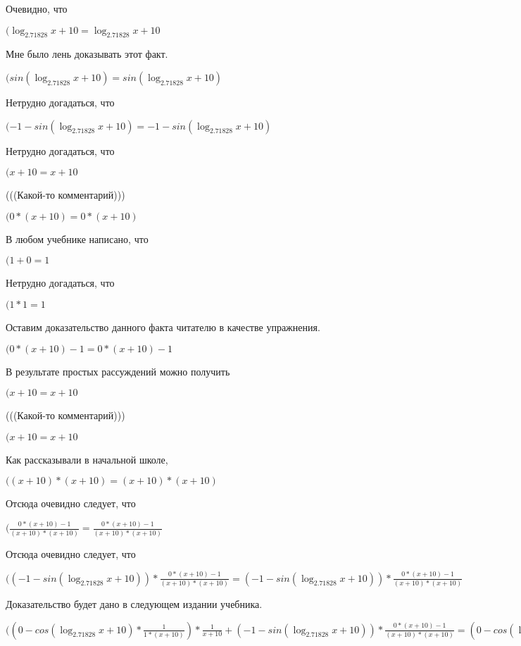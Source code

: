 \documentclass[12pt,a4paper,fleqn]{article}
\theoremstyle{definition}
\begin{document}
Очевидно, что

$(\log_{ 2.71828 }{ x  +  10 } = \log_{ 2.71828 }{ x  +  10 }$

Мне было лень доказывать этот факт.

$(sin(\log_{ 2.71828 }{ x  +  10 }) = sin(\log_{ 2.71828 }{ x  +  10 })$

Нетрудно догадаться, что

$( -1  - sin(\log_{ 2.71828 }{ x  +  10 }) =  -1  - sin(\log_{ 2.71828 }{ x  +  10 })$

Нетрудно догадаться, что

$( x  +  10  =  x  +  10 $

(((Какой-то комментарий)))

$( 0  * ( x  +  10 ) =  0  * ( x  +  10 )$

В любом учебнике написано, что

$( 1  +  0  =  1 $

Нетрудно догадаться, что

$( 1  *  1  =  1 $

Оставим доказательство данного факта читателю в качестве упражнения.

$( 0  * ( x  +  10 ) -  1  =  0  * ( x  +  10 ) -  1 $

В результате простых рассуждений можно получить

$( x  +  10  =  x  +  10 $

(((Какой-то комментарий)))

$( x  +  10  =  x  +  10 $

Как рассказывали в начальной школе,

$(( x  +  10 ) * ( x  +  10 ) = ( x  +  10 ) * ( x  +  10 )$

Отсюда очевидно следует, что

$(\frac{ 0  * ( x  +  10 ) -  1 }{( x  +  10 ) * ( x  +  10 )}
 = \frac{ 0  * ( x  +  10 ) -  1 }{( x  +  10 ) * ( x  +  10 )}
$

Отсюда очевидно следует, что

$(( -1  - sin(\log_{ 2.71828 }{ x  +  10 })) * \frac{ 0  * ( x  +  10 ) -  1 }{( x  +  10 ) * ( x  +  10 )}
 = ( -1  - sin(\log_{ 2.71828 }{ x  +  10 })) * \frac{ 0  * ( x  +  10 ) -  1 }{( x  +  10 ) * ( x  +  10 )}
$

Доказательство будет дано в следующем издании учебника.

$(( 0  - cos(\log_{ 2.71828 }{ x  +  10 }) * \frac{ 1 }{ 1  * ( x  +  10 )}
) * \frac{ 1 }{ x  +  10 }
 + ( -1  - sin(\log_{ 2.71828 }{ x  +  10 })) * \frac{ 0  * ( x  +  10 ) -  1 }{( x  +  10 ) * ( x  +  10 )}
 = ( 0  - cos(\log_{ 2.71828 }{ x  +  10 }) * \frac{ 1 }{ 1  * ( x  +  10 )}
) * \frac{ 1 }{ x  +  10 }
 + ( -1  - sin(\log_{ 2.71828 }{ x  +  10 })) * \frac{ 0  * ( x  +  10 ) -  1 }{( x  +  10 ) * ( x  +  10 )}
$
\end{document}
